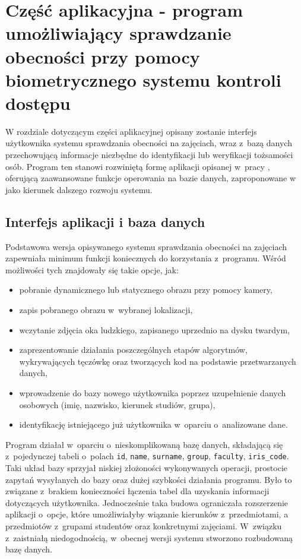 \chapter{Część aplikacyjna - program umożliwiający sprawdzanie obecności przy pomocy biometrycznego systemu kontroli dostępu}
\label{cha:systemKontroli}

W rozdziale dotyczącym części aplikacyjnej opisany zostanie interfejs użytkownika systemu sprawdzania obecności na zajęciach, wraz z~bazą danych przechowującą informacje niezbędne do identyfikacji lub weryfikacji tożsamości osób. Program ten stanowi rozwiniętą formę aplikacji opisanej w~pracy \cite{Gl11}, oferującą zaawansowane funkcje operowania na bazie danych, zaproponowane w~\cite{Gl11} jako kierunek dalszego rozwoju systemu.

\section{Interfejs aplikacji i baza danych}
\label{sec:aplikacja}

Podstawowa wersja opisywanego systemu sprawdzania obecności na zajęciach zapewniała minimum funkcji koniecznych do korzystania z~programu. Wśród możliwości tych znajdowały się takie opcje, jak:
\begin{itemize}
\item pobranie dynamicznego lub statycznego obrazu przy pomocy kamery,
\item zapis pobranego obrazu w~wybranej lokalizacji,
\item wczytanie zdjęcia oka ludzkiego, zapisanego uprzednio na dysku twardym,
\item zaprezentowanie działania poszczególnych etapów algorytmów, wykrywających tęczówkę oraz tworzących kod na podstawie przetwarzanych danych,
\item wprowadzenie do bazy nowego użytkownika poprzez uzupełnienie danych osobowych (imię, nazwisko, kierunek studiów, grupa),
\item identyfikację istniejącego już użytkownika w~oparciu o~analizowane dane.
\end{itemize}

Program działał w~oparciu o~nieskomplikowaną bazę danych, składającą się z~pojedynczej tabeli o~polach \verb!id!, \verb!name!, \verb!surname!, \verb!group!, \verb!faculty!, \verb!iris_code!. Taki układ bazy sprzyjał niskiej złożoności wykonywanych operacji, prostocie zapytań wysyłanych do bazy oraz dużej szybkości działania programu. Było to związane z~brakiem konieczności łączenia tabel dla uzyskania informacji dotyczących użytkownika. Jednocześnie taka budowa ograniczała rozszerzenie aplikacji o~opcje, które umożliwiałyby wiązanie kierunków z~przedmiotami, a przedmiotów z~grupami studentów oraz konkretnymi zajęciami. W~związku z~zaistniałą niedogodnością, w~obecnej wersji systemu stworzono rozbudowaną bazę danych.

